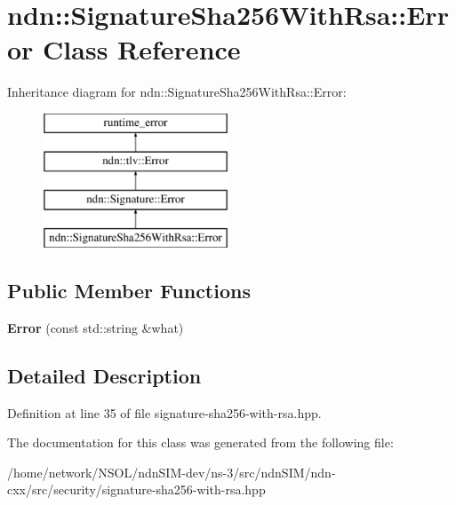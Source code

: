 \hypertarget{classndn_1_1SignatureSha256WithRsa_1_1Error}{}\section{ndn\+:\+:Signature\+Sha256\+With\+Rsa\+:\+:Error Class Reference}
\label{classndn_1_1SignatureSha256WithRsa_1_1Error}
Inheritance diagram for ndn\+:\+:Signature\+Sha256\+With\+Rsa\+:\+:Error\+:\begin{figure}[H]
\begin{center}
\leavevmode
\includegraphics[height=4.000000cm]{classndn_1_1SignatureSha256WithRsa_1_1Error}
\end{center}
\end{figure}
\subsection*{Public Member Functions}
\begin{DoxyCompactItemize}
\item 
{\bfseries Error} (const std\+::string \&what)\hypertarget{classndn_1_1SignatureSha256WithRsa_1_1Error_ad8f7a9210fdcd276927d1007dc9d1819}{}\label{classndn_1_1SignatureSha256WithRsa_1_1Error_ad8f7a9210fdcd276927d1007dc9d1819}

\end{DoxyCompactItemize}


\subsection{Detailed Description}


Definition at line 35 of file signature-\/sha256-\/with-\/rsa.\+hpp.



The documentation for this class was generated from the following file\+:\begin{DoxyCompactItemize}
\item 
/home/network/\+N\+S\+O\+L/ndn\+S\+I\+M-\/dev/ns-\/3/src/ndn\+S\+I\+M/ndn-\/cxx/src/security/signature-\/sha256-\/with-\/rsa.\+hpp\end{DoxyCompactItemize}
